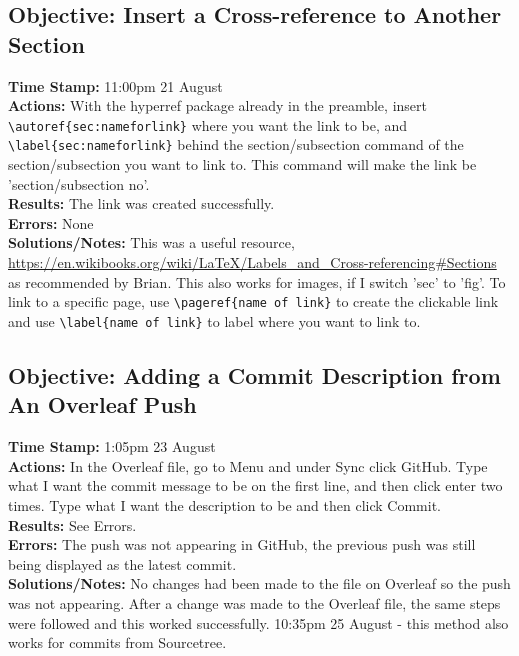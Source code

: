 \documentclass{article}
\begin{document}
\begin{FlushLeft}
\subsection{Objective: Insert a Cross-reference to Another Section}
\textbf{Time Stamp:} 11:00pm 21 August\\
\textbf{Actions:} With the hyperref package already in the preamble, insert \verb|\autoref{sec:nameforlink}| where you want the link to be, and \verb|\label{sec:nameforlink}| behind the section/subsection command of the section/subsection you want to link to. This command will make the link be 'section/subsection no'.\\
\textbf{Results:} The link was created successfully.\\
\textbf{Errors:} None\\
\textbf{Solutions/Notes:} This was a useful resource, \url{https://en.wikibooks.org/wiki/LaTeX/Labels_and_Cross-referencing#Sections} as recommended by Brian. This also works for images, if I switch 'sec' to 'fig'. To link to a specific page, use \verb|\pageref{name of link}| to create the clickable link and use \verb|\label{name of link}| to label where you want to link to.

\subsection{Objective: Adding a Commit Description from An Overleaf Push}\label{sec:description}
\textbf{Time Stamp:} 1:05pm 23 August\\
\textbf{Actions:} In the Overleaf file, go to Menu and under Sync click GitHub. Type what I want the commit message to be on the first line, and then click enter two times. Type what I want the description to be and then click Commit. \\
\textbf{Results:} See Errors.\\
\textbf{Errors:} The push was not appearing in GitHub, the previous push was still being displayed as the latest commit.\\
\textbf{Solutions/Notes:} No changes had been made to the file on Overleaf so the push was not appearing. After a change was made to the Overleaf file, the same steps were followed and this worked successfully. 10:35pm 25 August - this method also works for commits from Sourcetree.


\end{FlushLeft}
\end{document}
